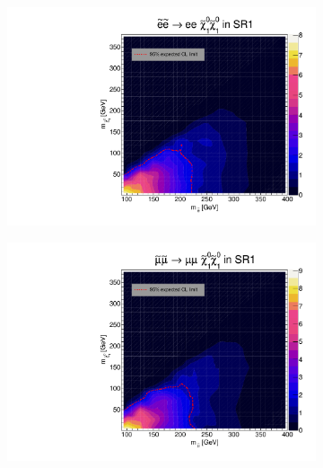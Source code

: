 \documentclass[12pt, a4paper]{book}
\begin{document}
\begin{figure}[!ht]
	\centering
	\begin{subfigure}[b]{0.49\textwidth}
      \centering
      \includegraphics[width=1\textwidth]{Limits/Model_independent/50-100/SlepSlep/SlepSlep_ee.pdf}
   \end{subfigure}
   \hfill
   \begin{subfigure}[b]{0.49\textwidth}
      \centering
      \includegraphics[width=1\textwidth]{Limits/Model_independent/50-100/SlepSlep/SlepSlep_uu.pdf}
   \end{subfigure}
   \hfill
   \begin{subfigure}[b]{0.49\textwidth}
      \centering

\end{subfigure}
\end{figure}
\end{document}
